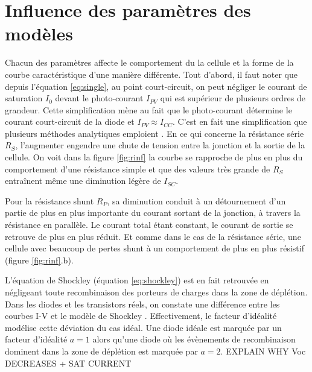 \section{Influence des paramètres des modèles}
Chacun des paramètres affecte le comportement du la cellule et la forme de la courbe caractéristique d'une manière différente. Tout d'abord, il faut noter que depuis l'équation \ref{eq:single}, au point court-circuit, on peut négliger le courant de saturation $I_0$ devant le photo-courant $I_{PV}$ qui est supérieur de plusieurs ordres de grandeur. Cette simplification mène au fait que le photo-courant détermine le courant court-circuit de la diode et $I_{PV} \approx I_{CC}$. C'est en fait une simplification que plusieurs méthodes analytiques emploient \cite{Tsai2008, Villalva2009}. En ce qui concerne la résistance série $R_S$, l'augmenter engendre une chute de tension entre la jonction et la sortie de la cellule. On voit dans la figure \ref{fig:rinf} la courbe se rapproche de plus en plus du comportement d'une résistance simple et que des valeurs très grande de $R_S$ entraînent même une diminution légère de $I_{SC}$.

Pour la résistance shunt $R_P$, sa diminution conduit à un détournement d'un partie de plus en plus importante du courant sortant de la jonction, à travers la résistance en parallèle. Le courant total étant constant, le courant de sortie se retrouve de plus en plus réduit. Et comme dans le cas de la résistance série, une cellule avec beaucoup de pertes shunt à un comportement de plus en plus résistif (figure \ref{fig:rinf}.b).

L'équation de Shockley (équation \ref{eq:shockley}) est en fait retrouvée en négligeant toute recombinaison des porteurs de charges dans la zone de déplétion. Dans les diodes et les transistors réels, on constate une différence entre les courbes I-V et le modèle de Shockley \cite{Shockley1949}. Effectivement, le facteur d'idéalité modélise cette déviation du cas idéal. Une diode idéale est marquée par un facteur d'idéalité $a = 1$ alors qu'une diode où les évènements de recombinaison dominent dans la zone de déplétion est marquée par $a = 2$. EXPLAIN WHY Voc DECREASES + SAT CURRENT

